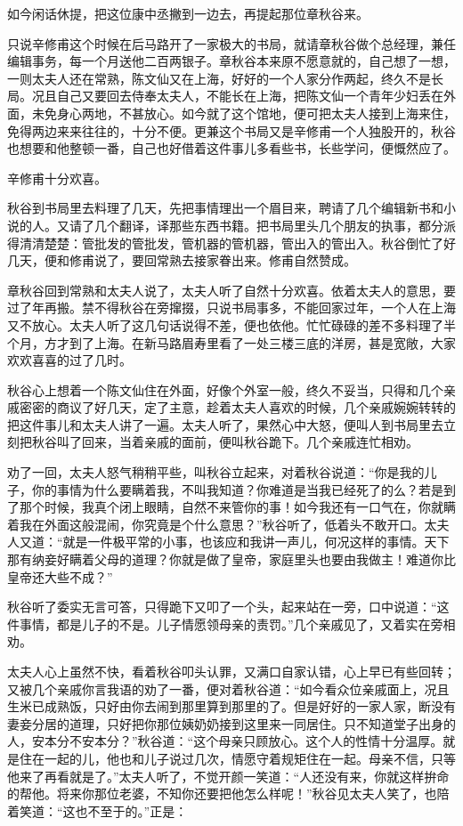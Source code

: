 \documentclass[12pt,UTF8]{ctexbook}
\begin{document}
{{{如今闲话休提，把这位康中丞撇到一边去，再提起那位章秋谷来。

只说辛修甫这个时候在后马路开了一家极大的书局，就请章秋谷做个总经理，兼任编辑事务，每一个月送他二百两银子。章秋谷本来原不愿意就的，自己想了一想，一则太夫人还在常熟，陈文仙又在上海，好好的一个人家分作两起，终久不是长局。况且自己又要回去侍奉太夫人，不能长在上海，把陈文仙一个青年少妇丢在外面，未免身心两地，不甚放心。如今就了这个馆地，便可把太夫人接到上海来住，免得两边来来往往的，十分不便。更兼这个书局又是辛修甫一个人独股开的，秋谷也想要和他整顿一番，自己也好借着这件事儿多看些书，长些学问，便慨然应了。

辛修甫十分欢喜。

秋谷到书局里去料理了几天，先把事情理出一个眉目来，聘请了几个编辑新书和小说的人。又请了几个翻译，译那些东西书籍。把书局里头几个朋友的执事，都分派得清清楚楚：管批发的管批发，管机器的管机器，管出入的管出入。秋谷倒忙了好几天，便和修甫说了，要回常熟去接家眷出来。修甫自然赞成。

章秋谷回到常熟和太夫人说了，太夫人听了自然十分欢喜。依着太夫人的意思，要过了年再搬。禁不得秋谷在旁撺掇，只说书局事多，不能回家过年，一个人在上海又不放心。太夫人听了这几句话说得不差，便也依他。忙忙碌碌的差不多料理了半个月，方才到了上海。在新马路眉寿里看了一处三楼三底的洋房，甚是宽敞，大家欢欢喜喜的过了几时。

秋谷心上想着一个陈文仙住在外面，好像个外室一般，终久不妥当，只得和几个亲戚密密的商议了好几天，定了主意，趁着太夫人喜欢的时候，几个亲戚婉婉转转的把这件事儿和太夫人讲了一遍。太夫人听了，果然心中大怒，便叫人到书局里去立刻把秋谷叫了回来，当着亲戚的面前，便叫秋谷跪下。几个亲戚连忙相劝。

劝了一回，太夫人怒气稍稍平些，叫秋谷立起来，对着秋谷说道：“你是我的儿子，你的事情为什么要瞒着我，不叫我知道？你难道是当我已经死了的么？若是到了那个时候，我真个闭上眼睛，自然不来管你的事！如今我还有一口气在，你就瞒着我在外面这般混闹，你究竟是个什么意思？”秋谷听了，低着头不敢开口。太夫人又道：“就是一件极平常的小事，也该应和我讲一声儿，何况这样的事情。天下那有纳妾好瞒着父母的道理？你就是做了皇帝，家庭里头也要由我做主！难道你比皇帝还大些不成？”

秋谷听了委实无言可答，只得跪下又叩了一个头，起来站在一旁，口中说道：“这件事情，都是儿子的不是。儿子情愿领母亲的责罚。”几个亲戚见了，又着实在旁相劝。

太夫人心上虽然不快，看着秋谷叩头认罪，又满口自家认错，心上早已有些回转；又被几个亲戚你言我语的劝了一番，便对着秋谷道：“如今看众位亲戚面上，况且生米已成熟饭，只好由你去闹到那里算到那里的了。但是好好的一家人家，断没有妻妾分居的道理，只好把你那位姨奶奶接到这里来一同居住。只不知道堂子出身的人，安本分不安本分？”秋谷道：“这个母亲只顾放心。这个人的性情十分温厚。就是住在一起的儿，他也和儿子说过几次，情愿守着规矩住在一起。母亲不信，只等他来了再看就是了。”太夫人听了，不觉开颜一笑道：“人还没有来，你就这样拚命的帮他。将来你那位老婆，不知你还要把他怎么样呢！”秋谷见太夫人笑了，也陪着笑道：“这也不至于的。”正是：

}}}
\end{document}
